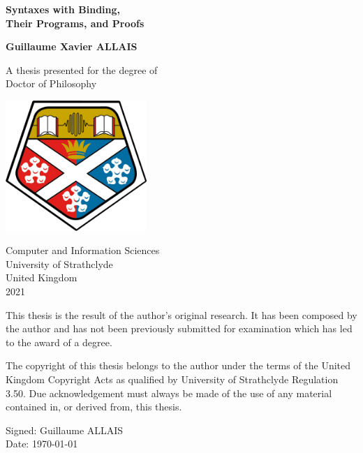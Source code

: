 \begin{titlingpage}
    \begin{center}
        \vspace*{1cm}

        \Huge
        \textbf{Syntaxes with Binding, \\ Their Programs, and Proofs}

        \vspace{1.5cm}

        \LARGE

        \textbf{Guillaume Xavier ALLAIS}

        \vfill

        A thesis presented for the degree of\\
        Doctor of Philosophy

        \vspace{0.8cm}

        \includegraphics[width=0.4\textwidth]{strath_coat}

        \vspace{0.8cm}

        \Large
        Computer and Information Sciences\\
        University of Strathclyde\\
        United Kingdom\\
        2021

    \end{center}
\end{titlingpage}


\pagebreak
{
\hspace{0pt}
\vfill{}
This thesis is the result of the author’s original research. It has been
composed by the author and has not been previously submitted for
examination which has led to the award of a degree.

The copyright of this thesis belongs to the author under the terms of the
United Kingdom Copyright Acts as qualified by University of Strathclyde
Regulation 3.50. Due acknowledgement must always be made of the use of
any material contained in, or derived from, this thesis.

\vspace{1.5cm}

\hfill
\begin{minipage}{0.4\textwidth}
Signed: Guillaume ALLAIS \\
Date: \today{}
\end{minipage}
\vfill
\hspace{0pt}
}
\pagebreak

